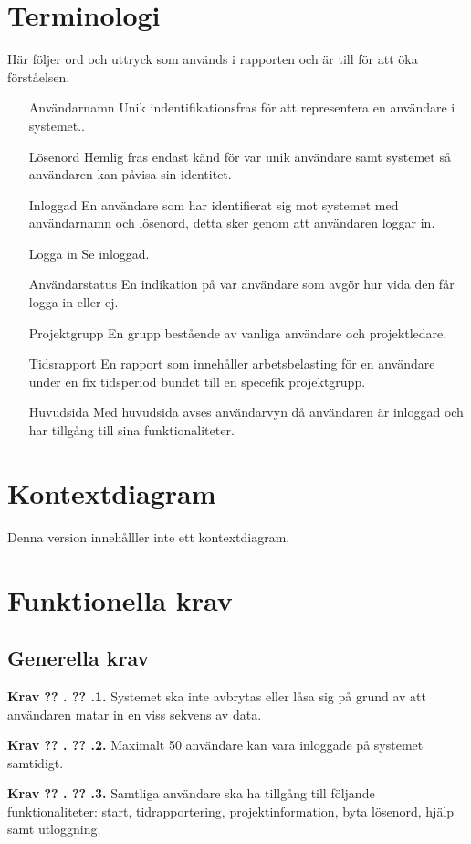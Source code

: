 \documentclass[a4paper]{article}
\newcommand\getcurrentref[1]{%
 \ifnumequal{\value{#1}}{0}
  {??}
  {\the\value{#1}}%
}
\newcommand\requirement[2]{
	\numberedrow{Krav}{#1}{#2}
}
\newcommand\numberedrow[3]{
	\noindent
	\textbf{#1 \getcurrentref{section}.\getcurrentref{subsection}.#2.} #3
	
}
\begin{document}
\section{Terminologi}
Här följer ord och uttryck som används i rapporten och är till för att öka förståelsen.
\begin{itemize}
\item [Användarnamn] Unik indentifikationsfras för att representera en användare i systemet..
\item [Lösenord] Hemlig fras endast känd för var unik användare samt systemet så användaren kan påvisa sin identitet.
\item [Inloggad] En användare som har identifierat sig mot systemet med användarnamn och lösenord, detta sker genom att användaren loggar in.
\item [Logga in] Se inloggad.
\item [Användarstatus] En indikation på var användare som avgör hur vida den får logga in eller ej.
\item [Projektgrupp] En grupp bestående av vanliga användare och projektledare.
\item [Tidsrapport] En rapport som innehåller arbetsbelasting för en användare under en fix tidsperiod bundet till en specefik projektgrupp.
\item [Huvudsida] Med huvudsida avses användarvyn då användaren är inloggad och har tillgång till sina funktionaliteter.
\end{itemize}
\section{Kontextdiagram}
Denna version innehålller inte ett kontextdiagram.
\section{Funktionella krav}
\subsection{Generella krav}
\label{krav-funk-gen}

 \requirement{1}{Systemet ska inte avbrytas eller låsa sig på grund av att användaren matar in en viss sekvens av data.}
\requirement{2}{Maximalt 50 användare kan vara inloggade på systemet samtidigt.}
\requirement{3}{Samtliga användare ska ha tillgång till följande funktionaliteter: start, tidrapportering, projektinformation, byta lösenord, hjälp samt utloggning.}
\end{document}
